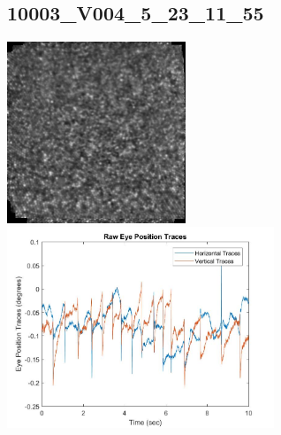 \documentclass[11pt]{article}
\begin{document}
\subsection{10003\_V004\_5\_23\_11\_55}
\includegraphics[width=0.40\textwidth, valign=m]{referenceframes/aoslo/10003_V004_5_23_11_55_dwt_nostim_gamscaled_bandfilt_refframe.jpg}
\includegraphics[width=0.60\textwidth, valign=m]{eyepositiontraces/aoslo/10003_V004_5_23_11_55.jpg}\\
\end{document}
